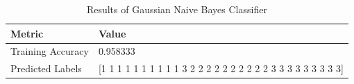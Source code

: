 \begin{table}[H]
\centering
\caption{Results of Gaussian Naive Bayes Classifier}
\begin{tabular}{ll}
\toprule
Metric & Value \\
\midrule
Training Accuracy & 0.958333 \\
Predicted Labels & [1 1 1 1 1 1 1 1 1 1 3 2 2 2 2 2 2 2 2 2 2 3 3 3 3 3 3 3 3 3] \\
\bottomrule
\end{tabular}
\end{table}
